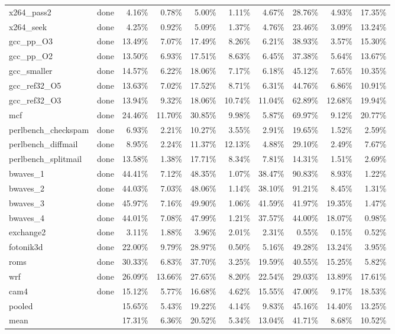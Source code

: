 \documentclass[10pt,a4paper,landscape]{article}
\begin{document}
{\begin{longtable}{llrrrrrrrr}
x264\_pass2 & done & 4.16\% & 0.78\% & 5.00\% & 1.11\% & 4.67\% & 28.76\% & 4.93\% & 17.35\% \\
x264\_seek & done & 4.25\% & 0.92\% & 5.09\% & 1.37\% & 4.76\% & 23.46\% & 3.09\% & 13.24\% \\
gcc\_pp\_O3 & done & 13.49\% & 7.07\% & 17.49\% & 8.26\% & 6.21\% & 38.93\% & 3.57\% & 15.30\% \\
gcc\_pp\_O2 & done & 13.50\% & 6.93\% & 17.51\% & 8.63\% & 6.45\% & 37.38\% & 5.64\% & 13.67\% \\
gcc\_smaller & done & 14.57\% & 6.22\% & 18.06\% & 7.17\% & 6.18\% & 45.12\% & 7.65\% & 10.35\% \\
gcc\_ref32\_O5 & done & 13.63\% & 7.02\% & 17.52\% & 8.71\% & 6.31\% & 44.76\% & 6.86\% & 10.91\% \\
gcc\_ref32\_O3 & done & 13.94\% & 9.32\% & 18.06\% & 10.74\% & 11.04\% & 62.89\% & 12.68\% & 19.94\% \\
mcf & done & 24.46\% & 11.70\% & 30.85\% & 9.98\% & 5.87\% & 69.97\% & 9.12\% & 20.77\% \\
perlbench\_checkspam & done & 6.93\% & 2.21\% & 10.27\% & 3.55\% & 2.91\% & 19.65\% & 1.52\% & 2.59\% \\
perlbench\_diffmail & done & 8.95\% & 2.24\% & 11.37\% & 12.13\% & 4.88\% & 29.10\% & 2.49\% & 7.67\% \\
perlbench\_splitmail & done & 13.58\% & 1.38\% & 17.71\% & 8.34\% & 7.81\% & 14.31\% & 1.51\% & 2.69\% \\
bwaves\_1 & done & 44.41\% & 7.12\% & 48.35\% & 1.07\% & 38.47\% & 90.83\% & 8.93\% & 1.22\% \\
bwaves\_2 & done & 44.03\% & 7.03\% & 48.06\% & 1.14\% & 38.10\% & 91.21\% & 8.45\% & 1.31\% \\
bwaves\_3 & done & 45.97\% & 7.16\% & 49.90\% & 1.06\% & 41.59\% & 41.97\% & 19.35\% & 1.47\% \\
bwaves\_4 & done & 44.01\% & 7.08\% & 47.99\% & 1.21\% & 37.57\% & 44.00\% & 18.07\% & 0.98\% \\
exchange2 & done & 3.11\% & 1.88\% & 3.96\% & 2.01\% & 2.31\% & 0.55\% & 0.15\% & 0.52\% \\
fotonik3d & done & 22.00\% & 9.79\% & 28.97\% & 0.50\% & 5.16\% & 49.28\% & 13.24\% & 3.95\% \\
roms & done & 30.33\% & 6.83\% & 37.70\% & 3.25\% & 19.59\% & 40.55\% & 15.25\% & 5.82\% \\
wrf & done & 26.09\% & 13.66\% & 27.65\% & 8.20\% & 22.54\% & 29.03\% & 13.89\% & 17.61\% \\
cam4 & done & 15.12\% & 5.77\% & 16.68\% & 4.62\% & 15.55\% & 47.00\% & 9.17\% & 18.53\% \\
\midrule
pooled &  & 15.65\% & 5.43\% & 19.22\% & 4.14\% & 9.83\% & 45.16\% & 14.40\% & 13.25\% \\
mean &  & 17.31\% & 6.36\% & 20.52\% & 5.34\% & 13.04\% & 41.71\% & 8.68\% & 10.52\% \\
\end{longtable}
}
\end{document}

